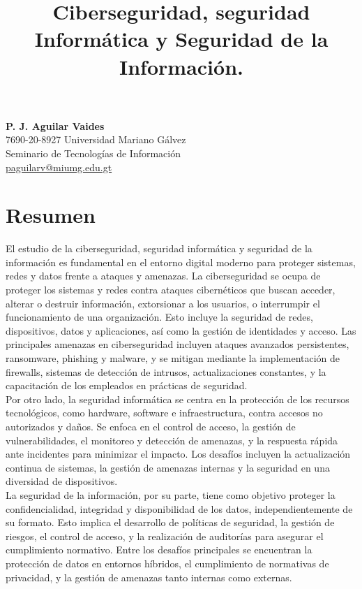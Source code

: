 \documentclass{article}
\title{\vspace{-2cm}\large\textbf{Ciberseguridad, seguridad Informática y Seguridad de la Información.}}
\author{}
\date{\vspace{-2.2cm}}
\begin{document}
\maketitle

\begin{center}
    \textbf{P. J. Aguilar Vaides} \\
    7690-20-8927 Universidad Mariano Gálvez \\
    Seminario de Tecnologías de Información \\
    \href{mailto:jperez@gmail.com}{paguilarv@miumg.edu.gt}
\end{center}

\section{Resumen}

El estudio de la ciberseguridad, seguridad informática y seguridad de la información es fundamental en el entorno digital moderno para proteger sistemas, redes y datos frente a ataques y amenazas. La ciberseguridad se ocupa de proteger los sistemas y redes contra ataques cibernéticos que buscan acceder, alterar o destruir información, extorsionar a los usuarios, o interrumpir el funcionamiento de una organización. Esto incluye la seguridad de redes, dispositivos, datos y aplicaciones, así como la gestión de identidades y acceso. Las principales amenazas en ciberseguridad incluyen ataques avanzados persistentes, ransomware, phishing y malware, y se mitigan mediante la implementación de firewalls, sistemas de detección de intrusos, actualizaciones constantes, y la capacitación de los empleados en prácticas de seguridad.\\

Por otro lado, la seguridad informática se centra en la protección de los recursos tecnológicos, como hardware, software e infraestructura, contra accesos no autorizados y daños. Se enfoca en el control de acceso, la gestión de vulnerabilidades, el monitoreo y detección de amenazas, y la respuesta rápida ante incidentes para minimizar el impacto. Los desafíos incluyen la actualización continua de sistemas, la gestión de amenazas internas y la seguridad en una diversidad de dispositivos.\\

La seguridad de la información, por su parte, tiene como objetivo proteger la confidencialidad, integridad y disponibilidad de los datos, independientemente de su formato. Esto implica el desarrollo de políticas de seguridad, la gestión de riesgos, el control de acceso, y la realización de auditorías para asegurar el cumplimiento normativo. Entre los desafíos principales se encuentran la protección de datos en entornos híbridos, el cumplimiento de normativas de privacidad, y la gestión de amenazas tanto internas como externas.\\
\end{document}
